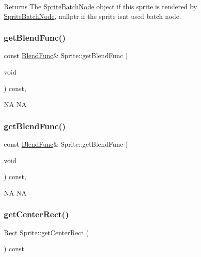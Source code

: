\begin{DoxyReturn}{Returns}
The \hyperlink{classSpriteBatchNode}{Sprite\+Batch\+Node} object if this sprite is rendered by \hyperlink{classSpriteBatchNode}{Sprite\+Batch\+Node}, nullptr if the sprite isn\textquotesingle{}t used batch node. 
\end{DoxyReturn}
\mbox{\label{classSprite_a7e9792ae4ddc7fef178386e5b8602361}} 
\subsubsection{\texorpdfstring{get\+Blend\+Func()}{getBlendFunc()}\hspace{0.1cm}{\footnotesize\ttfamily [1/2]}}
{\footnotesize\ttfamily const \hyperlink{structBlendFunc}{Blend\+Func}\& Sprite\+::get\+Blend\+Func (\begin{DoxyParamCaption}\item[{void}]{ }\end{DoxyParamCaption}) const\hspace{0.3cm}{\ttfamily [inline]}, {\ttfamily [override]}}

NA  NA \mbox{\label{classSprite_a7e9792ae4ddc7fef178386e5b8602361}} 
\subsubsection{\texorpdfstring{get\+Blend\+Func()}{getBlendFunc()}\hspace{0.1cm}{\footnotesize\ttfamily [2/2]}}
{\footnotesize\ttfamily const \hyperlink{structBlendFunc}{Blend\+Func}\& Sprite\+::get\+Blend\+Func (\begin{DoxyParamCaption}\item[{void}]{ }\end{DoxyParamCaption}) const\hspace{0.3cm}{\ttfamily [inline]}, {\ttfamily [override]}}

NA  NA \mbox{\label{classSprite_a22609e0c2de3b6dbfcbb8df232d69a7a}} 
\subsubsection{\texorpdfstring{get\+Center\+Rect()}{getCenterRect()}}
{\footnotesize\ttfamily \hyperlink{classRect}{Rect} Sprite\+::get\+Center\+Rect (\begin{DoxyParamCaption}{ }\end{DoxyParamCaption}) const\hspace{0.3cm}{\ttfamily [virtual]}}



